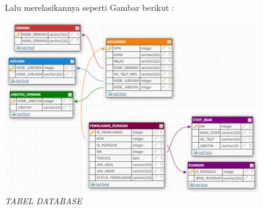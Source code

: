 \begin{itemize}
        \begin{figure}
        \par Lalu merelasikannya seperti Gambar berikut :
        \begin{center}
        \includegraphics[scale=0.45]{figures/TABEL.png}
        \caption{\textit{TABEL DATABASE}}
        \end{center}
        \end{figure}
\end{itemize}